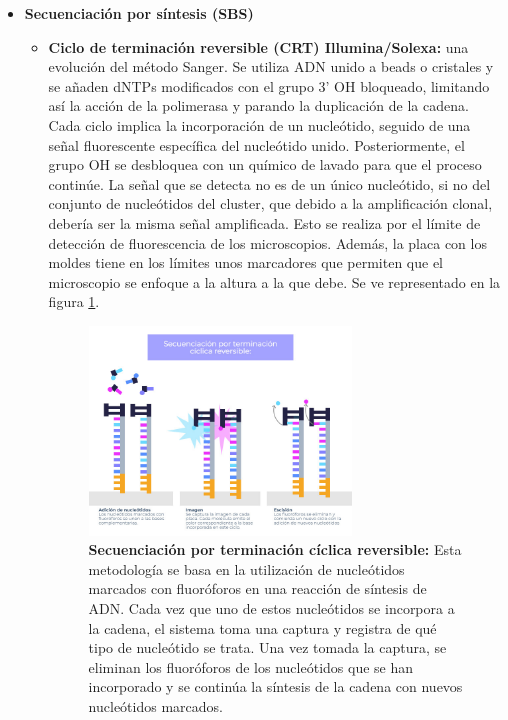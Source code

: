 \begin{itemize}
\item \textbf{Secuenciación por síntesis (SBS)}
\begin{itemize}
\item \textbf{Ciclo de terminación reversible (CRT) Illumina/Solexa:} una evolución del método Sanger. Se utiliza ADN unido a beads o cristales y se añaden dNTPs modificados con el grupo 3’ OH bloqueado, limitando así la acción de la polimerasa y parando la duplicación de la cadena. Cada ciclo implica la incorporación de un nucleótido, seguido de una señal fluorescente específica del nucleótido unido. Posteriormente, el grupo OH se desbloquea con un químico de lavado para que el proceso continúe. La señal que se detecta no es de un único nucleótido, si no del conjunto de nucleótidos del cluster, que debido a la amplificación clonal, debería ser la misma señal amplificada. Esto se realiza por el límite de detección de fluorescencia de los microscopios. Además, la placa con los moldes tiene en los límites unos marcadores que permiten que el microscopio se enfoque a la altura a la que debe. Se ve representado en la figura \ref{fig:CRT}.

\begin{figure}[htbp]
\centering
\includegraphics[width = 0.7\textwidth]{figs/secuenciacion-terminacion-ciclica-reversible.jpg}
\caption{\textbf{Secuenciación por terminación cíclica reversible:}
Esta metodología se basa en la utilización de nucleótidos marcados con fluoróforos en una reacción de síntesis de ADN. Cada vez que uno de estos nucleótidos se incorpora a la cadena, el sistema toma una captura y registra de qué tipo de nucleótido se trata. Una vez tomada la captura, se eliminan los fluoróforos de los nucleótidos que se han incorporado y se continúa la síntesis de la cadena con nuevos nucleótidos marcados.}
\label{fig:CRT}
\end{figure}


\end{itemize}
\end{itemize}
